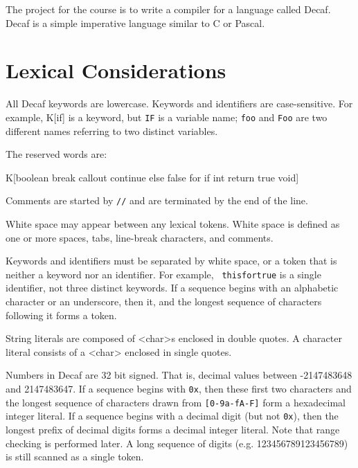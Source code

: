 
{\bnf
\gdef\kw#1{{\bnf K[#1]}}
\gdef\term#1{{\bnf T[#1]}}
\gdef\nt#1{{\bnf <#1>}}}



The project for the course is to write a compiler for a language
called Decaf.  Decaf is a simple imperative language similar to C or
Pascal.

\section*{Lexical Considerations}

All Decaf keywords are lowercase.  Keywords and
identifiers are case-sensitive.  For example, \kw{if} is a keyword,
but {\tt IF} is a variable name; {\tt foo} and {\tt Foo} are two
different names referring to two distinct variables.

The reserved words are:


\kw{boolean break callout continue else false for
  if int return true void}

Comments are started by {\tt //} and are terminated by the end of the
line.

White space may appear between any lexical tokens.  White space is
defined as one or more spaces, tabs, line-break
characters, and comments.

Keywords and identifiers must be separated by white space, or a token
that is neither a keyword nor an identifier.  For example, {\tt
thisfortrue} is a single identifier, not three distinct keywords.
If a sequence begins with an alphabetic character or an underscore,
then it, and the longest sequence of characters following it forms a
token.

String literals are composed of {\bnf <char>}s enclosed in double
quotes.  A character literal consists of a {\bnf <char>} enclosed in
single quotes.

Numbers in Decaf are 32 bit signed. That is, decimal values between
-2147483648 and 2147483647.  If a sequence begins with {\tt 0x}, then
these first two characters and the longest sequence of characters
drawn from {\tt [0-9a-fA-F]} form a hexadecimal integer literal.  If a
sequence begins with a decimal digit (but not {\tt 0x}), then the
longest prefix of decimal digits forms a decimal integer literal.
Note that range checking is performed later.  A long sequence of
digits (e.g. 123456789123456789) is still scanned as a single token.


